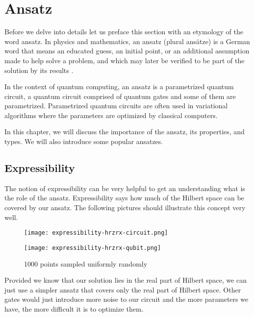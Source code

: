 \chapter{Ansatz}\label{ch:ansatz}
Before we delve into details let us preface this section with an etymology of the word ansatz. In physics and mathematics, an ansatz (plural ansätze) is a German word that means an educated guess, an initial point, or an additional assumption made to help solve a problem, and which may later be verified to be part of the solution by its results \cite{ansatz_etymology}.

In the context of quantum computing, an ansatz is a parametrized quantum circuit,  a quantum circuit comprised of quantum gates and some of them are parametrized. Parametrized quantum circuits are often used in variational algorithms where the parameters are optimized by classical computers.

In this chapter, we will discuss the importance of the ansatz, its properties, and types. We will also introduce some popular ansatzes.

\section{Expressibility}
The notion of expressibility can be very helpful to get an understanding what is the role of the ansatz. Expressibility says how much of the Hilbert space can be covered by our ansatz. The following pictures should illustrate this concept very well.

\begin{figure}[H]
        \centering
        \begin{minipage}{0.4\linewidth}
            \centering
            \texttt{[image: expressibility-hrzrx-circuit.png]}
            \vfill
        \end{minipage}
        \hfill
        \begin{minipage}{0.4\linewidth}
            \centering
            \texttt{[image: expressibility-hrzrx-qubit.png]}
            \vfill
        \end{minipage}
        \caption{1000 points sampled uniformly randomly}
\end{figure}

Provided we know that our solution lies in the real part of Hilbert space, we can just use a simpler ansatz that covers only the real part of Hilbert space. Other gates would just introduce more noise to our circuit and the more parameters we have, the more difficult it is to optimize them.


